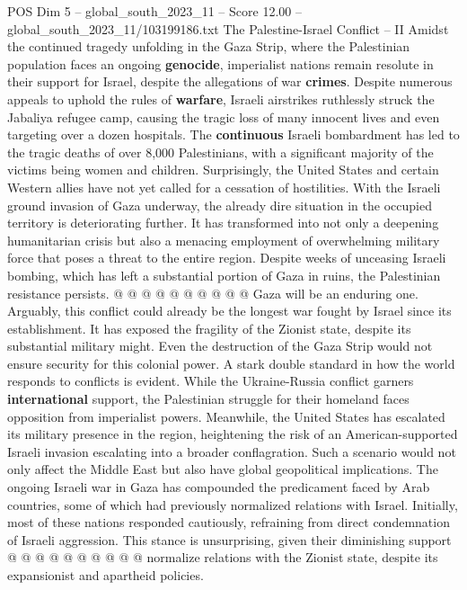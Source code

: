 \begin{textsample}{POS Dim 5 – global\_south\_2023\_11 – Score 12.00 – global\_south\_2023\_11/103199186.txt}  \label{ex:f5_pos_279}
The Palestine-Israel Conflict -- II Amidst the continued tragedy unfolding in the Gaza Strip, where the Palestinian population faces an ongoing \textbf{genocide}, imperialist nations remain resolute in their support for Israel, despite the allegations of war \textbf{crimes}.
Despite numerous appeals to uphold the rules of \textbf{warfare}, Israeli airstrikes ruthlessly struck the Jabaliya refugee camp, causing the tragic loss of many innocent lives and even targeting over a dozen hospitals.
The \textbf{continuous} Israeli bombardment has led to the tragic deaths of over 8,000 Palestinians, with a significant majority of the victims being women and children.
Surprisingly, the United States and certain Western allies have not yet called for a cessation of hostilities.
With the Israeli ground invasion of Gaza underway, the already dire situation in the occupied territory is deteriorating further.
It has transformed into not only a deepening humanitarian crisis but also a menacing employment of overwhelming military force that poses a threat to the entire region.
Despite weeks of unceasing Israeli bombing, which has left a substantial portion of Gaza in ruins, the Palestinian resistance persists. @ @ @ @ @ @ @ @ @ @ Gaza will be an enduring one.
Arguably, this conflict could already be the longest war fought by Israel since its establishment.
It has exposed the fragility of the Zionist state, despite its substantial military might.
Even the destruction of the Gaza Strip would not ensure security for this colonial power.
A stark double standard in how the world responds to conflicts is evident.
While the Ukraine-Russia conflict garners \textbf{international} support, the Palestinian struggle for their homeland faces opposition from imperialist powers.
Meanwhile, the United States has escalated its military presence in the region, heightening the risk of an American-supported Israeli invasion escalating into a broader conflagration.
Such a scenario would not only affect the Middle East but also have global geopolitical implications.
The ongoing Israeli war in Gaza has compounded the predicament faced by Arab countries, some of which had previously normalized relations with Israel.
Initially, most of these nations responded cautiously, refraining from direct condemnation of Israeli aggression.
This stance is unsurprising, given their diminishing support @ @ @ @ @ @ @ @ @ @ normalize relations with the Zionist state, despite its expansionist and apartheid policies.

\end{textsample}
